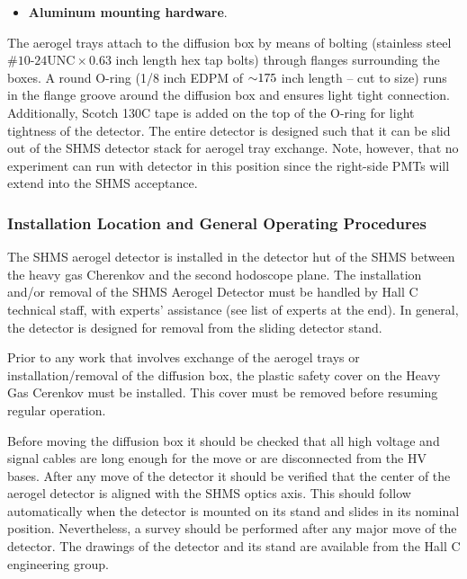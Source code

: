 {\begin{itemize}
\begin{itemize}
      of Millipore in the two lower refractive index trays (SP-15 and
      SP-11) to optimize light collection.
  \end{itemize}
  \item \textbf{Aluminum mounting hardware}.
\end{itemize}
The aerogel trays attach to the diffusion box by means of bolting
(stainless steel $\textrm{\#10-24UNC}\times 0.63$ inch length hex tap bolts) through
flanges surrounding the boxes. A round O-ring (1/8 inch EDPM of $\mathord{\sim} 175$
inch
length – cut to size) runs in the flange groove around the diffusion
box and ensures light tight connection. Additionally, Scotch 130C tape
is added on the top of the O-ring for light tightness of the
detector. The entire detector is designed such that it can be slid out
of the SHMS detector stack for aerogel tray exchange. Note, however,
that no experiment can run with detector in this position since the
right-side PMTs will extend into the SHMS acceptance.

\subsubsection{Installation Location and General Operating Procedures}
The SHMS aerogel detector is installed in the detector hut of the SHMS
between the heavy gas Cherenkov and the second hodoscope plane. The
installation and/or removal of the SHMS Aerogel Detector must be
handled by Hall C technical staff, with experts’ assistance (see list
of experts at the end). In general, the detector is designed for
removal from the sliding detector stand.

Prior to any work that involves exchange of the aerogel trays or
installation/removal of the diffusion box, the plastic safety cover on
the Heavy Gas Cerenkov must be installed. This cover must be removed
before resuming regular operation.

Before moving the diffusion box it should be checked that all high
voltage and signal cables are long enough for the move or are
disconnected from the HV bases. After any move of the detector it
should be verified that the center of the aerogel detector is aligned
with the SHMS optics axis. This should follow automatically when the
detector is mounted on its stand and slides in its nominal
position. Nevertheless, a survey should be performed after any major
move of the detector. The drawings of the detector and its stand are
available from the Hall C engineering group.

}
